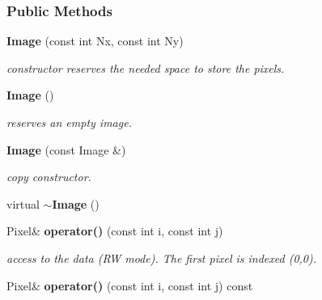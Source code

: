\subsubsection*{Public Methods}
\begin{CompactItemize}
\item 
{}
{\bf Image} (const int Nx, const int Ny)\label{class_image_a0}

\begin{CompactList}\small\item\em constructor reserves the needed space to store the pixels.\item\end{CompactList}\item 
{}
{\bf Image} ()\label{class_image_a1}

\begin{CompactList}\small\item\em reserves an empty image.\item\end{CompactList}\item 
{}
{\bf Image} (const Image \&)\label{class_image_a2}

\begin{CompactList}\small\item\em copy constructor.\item\end{CompactList}\item 
{}
virtual {\bf $\sim$Image} ()\label{class_image_a3}

\item 
{}
Pixel\& {\bf operator()} (const int i, const int j)\label{class_image_a4}

\begin{CompactList}\small\item\em access to the data (RW mode). The first pixel is indexed (0,0).\item\end{CompactList}\item 
{}
Pixel\& {\bf operator()} (const int i, const int j) const\label{class_image_a5}


\end{CompactItemize}
